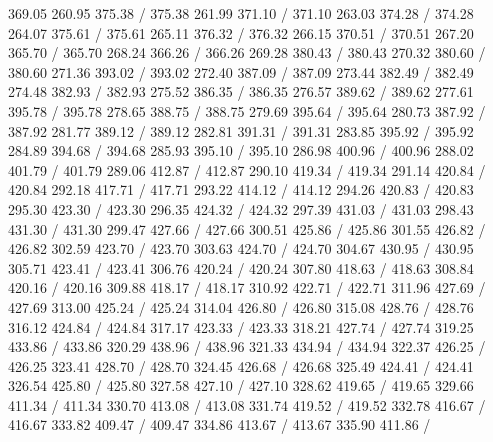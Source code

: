 { 369.05 260.95 375.38 /
 375.38 261.99 371.10 /
 371.10 263.03 374.28 /
 374.28 264.07 375.61 /
 375.61 265.11 376.32 /
 376.32 266.15 370.51 /
 370.51 267.20 365.70 /
 365.70 268.24 366.26 /
 366.26 269.28 380.43 /
 380.43 270.32 380.60 /
 380.60 271.36 393.02 /
 393.02 272.40 387.09 /
 387.09 273.44 382.49 /
 382.49 274.48 382.93 /
 382.93 275.52 386.35 /
 386.35 276.57 389.62 /
 389.62 277.61 395.78 /
 395.78 278.65 388.75 /
 388.75 279.69 395.64 /
 395.64 280.73 387.92 /
 387.92 281.77 389.12 /
 389.12 282.81 391.31 /
 391.31 283.85 395.92 /
 395.92 284.89 394.68 /
 394.68 285.93 395.10 /
 395.10 286.98 400.96 /
 400.96 288.02 401.79 /
 401.79 289.06 412.87 /
 412.87 290.10 419.34 /
 419.34 291.14 420.84 /
 420.84 292.18 417.71 /
 417.71 293.22 414.12 /
 414.12 294.26 420.83 /
 420.83 295.30 423.30 /
 423.30 296.35 424.32 /
 424.32 297.39 431.03 /
 431.03 298.43 431.30 /
 431.30 299.47 427.66 /
 427.66 300.51 425.86 /
 425.86 301.55 426.82 /
 426.82 302.59 423.70 /
 423.70 303.63 424.70 /
 424.70 304.67 430.95 /
 430.95 305.71 423.41 /
 423.41 306.76 420.24 /
 420.24 307.80 418.63 /
 418.63 308.84 420.16 /
 420.16 309.88 418.17 /
 418.17 310.92 422.71 /
 422.71 311.96 427.69 /
 427.69 313.00 425.24 /
 425.24 314.04 426.80 /
 426.80 315.08 428.76 /
 428.76 316.12 424.84 /
 424.84 317.17 423.33 /
 423.33 318.21 427.74 /
 427.74 319.25 433.86 /
 433.86 320.29 438.96 /
 438.96 321.33 434.94 /
 434.94 322.37 426.25 /
 426.25 323.41 428.70 /
 428.70 324.45 426.68 /
 426.68 325.49 424.41 /
 424.41 326.54 425.80 /
 425.80 327.58 427.10 /
 427.10 328.62 419.65 /
 419.65 329.66 411.34 /
 411.34 330.70 413.08 /
 413.08 331.74 419.52 /
 419.52 332.78 416.67 /
 416.67 333.82 409.47 /
 409.47 334.86 413.67 /
 413.67 335.90 411.86 /
}
